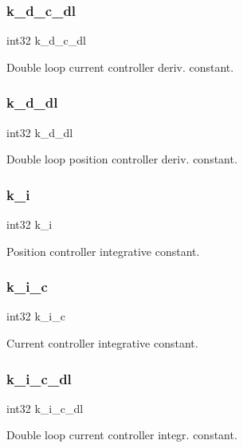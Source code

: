\subsubsection{k\+\_\+d\+\_\+c\+\_\+dl}
{\footnotesize\ttfamily int32 k\+\_\+d\+\_\+c\+\_\+dl}

Double loop current controller deriv. constant. \mbox{\label{structst__mem_adc3d57142df06bc753d1982fa409ffea}} 
\subsubsection{k\+\_\+d\+\_\+dl}
{\footnotesize\ttfamily int32 k\+\_\+d\+\_\+dl}

Double loop position controller deriv. constant. \mbox{\label{structst__mem_ad62fb8a39e2de160e14be47e3ff08014}} 
\subsubsection{k\+\_\+i}
{\footnotesize\ttfamily int32 k\+\_\+i}

Position controller integrative constant. \mbox{\label{structst__mem_a942ea80eb197a70dd0ba3da33d1e6c6e}} 
\subsubsection{k\+\_\+i\+\_\+c}
{\footnotesize\ttfamily int32 k\+\_\+i\+\_\+c}

Current controller integrative constant. \mbox{\label{structst__mem_afc912f90d6ba2f39046a0daf0207f116}} 
\subsubsection{k\+\_\+i\+\_\+c\+\_\+dl}
{\footnotesize\ttfamily int32 k\+\_\+i\+\_\+c\+\_\+dl}

Double loop current controller integr. constant. \mbox{\label{structst__mem_ab5c86695ff730d3387a8c6b089945a7e}} 
